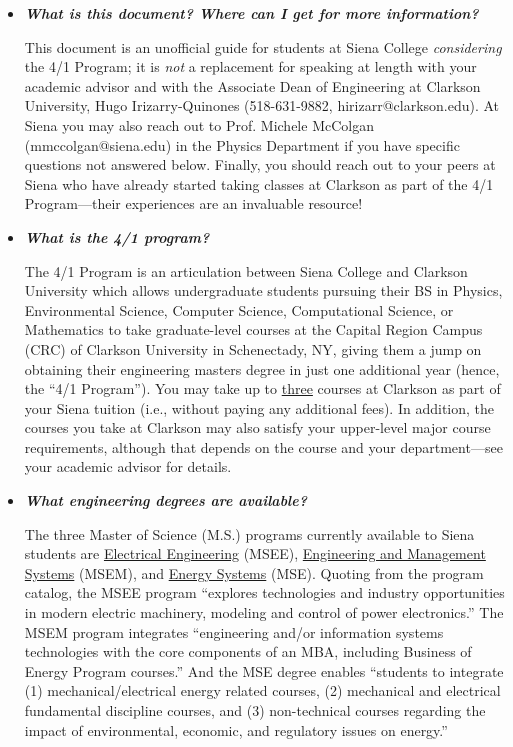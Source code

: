 \documentclass[12pt]{article}
\begin{document}
\begin{itemize}
\item{{\bf {\em What is this document? Where can I get for more information?}} 

This document is an unofficial guide for students at Siena College
\emph{considering} the 4/1 Program; it is \emph{not} a replacement for speaking
at length with your academic advisor and with the Associate Dean of Engineering
at Clarkson University, Hugo Irizarry-Quinones (518-631-9882,
hirizarr@clarkson.edu).  At Siena you may also reach out to Prof. Michele
McColgan (mmccolgan@siena.edu) in the Physics Department if you have specific
questions not answered below.  Finally, you should reach out to your peers at
Siena who have already started taking classes at Clarkson as part of the 4/1
Program---their experiences are an invaluable resource!}

\item{{\bf {\em What is the 4/1 program?}}

The 4/1 Program is an articulation between Siena College and Clarkson University
which allows undergraduate students pursuing their BS in Physics, Environmental
Science, Computer Science, Computational Science, or Mathematics to take
graduate-level courses at the Capital Region Campus (CRC) of Clarkson University
in Schenectady, NY, giving them a jump on obtaining their engineering masters
degree in just one additional year (hence, the ``4/1 Program'').  You may take
up to \underline{three} courses at Clarkson as part of your Siena tuition (i.e.,
without paying any additional fees).  In addition, the courses you take at
Clarkson may also satisfy your upper-level major course requirements, although
that depends on the course and your department---see your academic advisor for
details.}


\item{{\bf {\em What engineering degrees are available?}}

The three Master of Science (M.S.) programs currently available to Siena
students are \ul{Electrical Engineering} (MSEE), \ul{Engineering and Management
  Systems} (MSEM), and \ul{Energy Systems} (MSE).  Quoting from the program
catalog, the MSEE program ``explores technologies and industry opportunities in
modern electric machinery, modeling and control of power electronics.''  The
MSEM program integrates ``engineering and/or information systems technologies
with the core components of an MBA, including Business of Energy Program
courses.''  And the MSE degree enables ``students to integrate (1)
mechanical/electrical energy related courses, (2) mechanical and electrical
fundamental discipline courses, and (3) non-technical courses regarding the
impact of environmental, economic, and regulatory issues on energy.''
}


\end{itemize}
\end{document}
